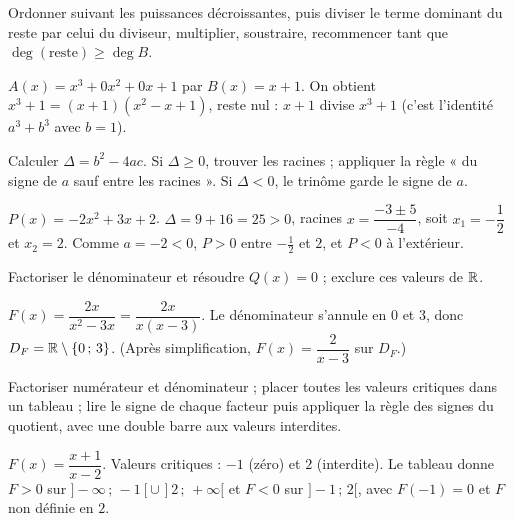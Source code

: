 Ordonner suivant les puissances décroissantes, puis diviser le terme dominant du reste
par celui du diviseur, multiplier, soustraire, recommencer tant que $\deg(\text{reste})\ge\deg B$.
\begin{exemple}
$A(x)=x^3+0x^2+0x+1$ par $B(x)=x+1$. On obtient $x^3+1=(x+1)(x^2-x+1)$, reste nul :
$x+1$ divise $x^3+1$ (c'est l'identité $a^3+b^3$ avec $b=1$).
\end{exemple}

Calculer $\Delta=b^2-4ac$. Si $\Delta\ge 0$, trouver les racines ; appliquer la règle
« du signe de $a$ sauf entre les racines ». Si $\Delta<0$, le trinôme garde le signe de $a$.
\begin{exemple}
$P(x)=-2x^2+3x+2$. $\Delta=9+16=25>0$, racines
$x=\dfrac{-3\pm5}{-4}$, soit $x_1=-\dfrac12$ et $x_2=2$. Comme $a=-2<0$, $P>0$ entre
$-\frac12$ et $2$, et $P<0$ à l'extérieur.
\end{exemple}

Factoriser le dénominateur et résoudre $Q(x)=0$ ; exclure ces valeurs de $\mathbb{R}$.
\begin{exemple}
$F(x)=\dfrac{2x}{x^2-3x}=\dfrac{2x}{x(x-3)}$. Le dénominateur s'annule en $0$ et $3$,
donc $D_F=\mathbb{R}\setminus\{0\,;\,3\}$. (Après simplification, $F(x)=\dfrac{2}{x-3}$ sur $D_F$.)
\end{exemple}

Factoriser numérateur et dénominateur ; placer toutes les valeurs critiques dans un
tableau ; lire le signe de chaque facteur puis appliquer la règle des signes du quotient,
avec une double barre aux valeurs interdites.
\begin{exemple}
$F(x)=\dfrac{x+1}{x-2}$. Valeurs critiques : $-1$ (zéro) et $2$ (interdite). Le tableau
donne $F>0$ sur $]-\infty\,;\,-1[\cup\,]2\,;\,+\infty[$ et $F<0$ sur $]-1\,;\,2[$, avec
$F(-1)=0$ et $F$ non définie en $2$.
\end{exemple}

